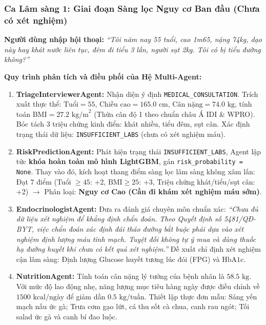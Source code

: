 \documentclass[12pt,a4paper]{article}
\begin{document}
\subsubsection{Ca Lâm sàng 1: Giai đoạn Sàng lọc Nguy cơ Ban đầu (Chưa có xét nghiệm)}
\begin{tcolorbox}[colback=lightgray,colframe=blue!60!black,title=Dữ Liệu Đầu Vào Ca Lâm Sàng 1]
\textbf{Người dùng nhập hội thoại:} \textit{“Tôi năm nay 55 tuổi, cao 1m65, nặng 74kg, dạo này hay khát nước liên tục, đêm đi tiểu 3 lần, người sụt 2kg. Tôi có bị tiểu đường không?”}
\end{tcolorbox}

\textbf{Quy trình phân tích và điều phối của Hệ Multi-Agent:}
\begin{enumerate}[leftmargin=1.2cm]
    \item \textbf{TriageInterviewerAgent:} Nhận diện ý định \texttt{MEDICAL\_CONSULTATION}. Trích xuất thực thể: $\text{Tuổi} = 55$, $\text{Chiều cao} = 165.0\text{ cm}$, $\text{Cân nặng} = 74.0\text{ kg}$, tính toán $\text{BMI} = 27.2\text{ kg/m}^2$ (Thừa cân độ 1 theo chuẩn châu Á IDI \& WPRO). Bóc tách 3 triệu chứng kinh điển: khát nhiều, tiểu đêm, sụt cân. Xác định trạng thái dữ liệu: \texttt{INSUFFICIENT\_LABS} (chưa có xét nghiệm máu).
    \item \textbf{RiskPredictionAgent:} Phát hiện trạng thái \texttt{INSUFFICIENT\_LABS}, Agent lập tức \textbf{khóa hoàn toàn mô hình LightGBM}, gán \texttt{risk\_probability = None}. Thay vào đó, kích hoạt thang điểm sàng lọc lâm sàng không xâm lấn: Đạt 7 điểm (Tuổi $\ge 45$: +2, $\text{BMI} \ge 25$: +3, Triệu chứng khát/tiểu/sụt cân: +2) $\to$ Phân loại: \textbf{Nguy cơ Cao (Cần đi khám xét nghiệm máu sớm)}.
    \item \textbf{EndocrinologistAgent:} Đưa ra đánh giá chuyên môn chuẩn xác: \textit{“Chưa đủ dữ liệu xét nghiệm để khẳng định chẩn đoán. Theo Quyết định số 5481/QĐ-BYT, việc chẩn đoán xác định đái tháo đường bắt buộc phải dựa vào xét nghiệm định lượng máu tĩnh mạch. Tuyệt đối không tự ý mua và dùng thuốc hạ đường huyết khi chưa có kết quả xét nghiệm.”} Đề xuất chỉ định xét nghiệm cận lâm sàng: Định lượng Glucose huyết tương lúc đói (FPG) và $\text{HbA1c}$.
    \item \textbf{NutritionAgent:} Tính toán cân nặng lý tưởng của bệnh nhân là $58.5\text{ kg}$. Với mức độ lao động nhẹ, năng lượng mục tiêu hàng ngày được điều chỉnh về $1500\text{ kcal/ngày}$ để giảm dần $0.5\text{ kg/tuần}$. Thiết lập thực đơn mẫu: Sáng yến mạch nấu ức gà; Trưa cơm gạo lứt, cá thu sốt cà chua, canh rau ngót; Tối salad ức gà và canh bí đao luộc.

\end{enumerate}
\end{document}
